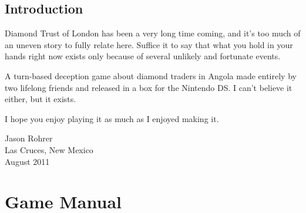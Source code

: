 \documentclass[8pt]{extbook}
\makeatletter
\newcommand{\startopenany}{\@openrightfalse}
\newcommand{\stopopenany}{\@openrighttrue}
\makeatother
\begin{document}
\frontmatter

\tableofcontents


\startopenany
\chapter{Introduction}

Diamond Trust of London has been a very long time coming, and it's too much of an uneven story to fully relate here.  Suffice it to say that what you hold in your hands right now exists only because of several unlikely and fortunate events.  

A turn-based deception game about diamond traders in Angola made entirely by two lifelong friends and released in a box for the Nintendo DS.  I can't believe it either, but it exists.  

I hope you enjoy playing it as much as I enjoyed making it.

\begin{flushright}
\begin{minipage}{1.5in}
Jason Rohrer\\
Las Cruces, New Mexico\\
August 2011
\end{minipage}
\end{flushright}


\stopopenany

\mainmatter


\makeatletter
\def\myEndPart{\vfil


              \if@twoside
                \null
                \thispagestyle{empty}%
                \newpage
              \fi
              \if@tempswa
                \twocolumn
              \fi}
\makeatother

\makeatletter
\def\standardEndPart{\vfil\newpage
              \if@twoside
                \null
                \thispagestyle{empty}%
                \newpage
              \fi
              \if@tempswa
                \twocolumn
              \fi}
\makeatother




\makeatletter
\renewcommand\@endpart{\myEndPart}
\makeatother

\part{Game Manual}
\addtocounter{chapter}{1}
\setcounter{section}{0}
\end{document}

